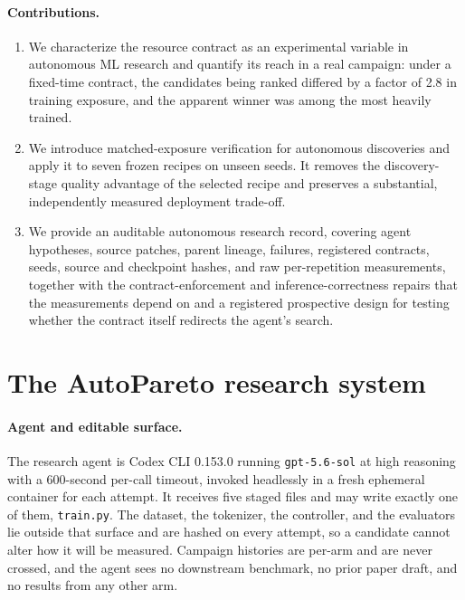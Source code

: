 \documentclass{article}
\begin{document}
\paragraph{Contributions.}
\begin{enumerate}\setlength{\itemsep}{1pt}
\item We characterize the resource contract as an experimental variable in autonomous ML research and quantify its reach in a real campaign: under a fixed-time contract, the candidates being ranked differed by a factor of 2.8 in training exposure, and the apparent winner was among the most heavily trained.
\item We introduce matched-exposure verification for autonomous discoveries and apply it to seven frozen recipes on unseen seeds. It removes the discovery-stage quality advantage of the selected recipe and preserves a substantial, independently measured deployment trade-off.
\item We provide an auditable autonomous research record, covering agent hypotheses, source patches, parent lineage, failures, registered contracts, seeds, source and checkpoint hashes, and raw per-repetition measurements, together with the contract-enforcement and inference-correctness repairs that the measurements depend on and a registered prospective design for testing whether the contract itself redirects the agent's search.
\end{enumerate}

\section{The AutoPareto research system}\label{sec:system}
\paragraph{Agent and editable surface.} The research agent is Codex CLI 0.153.0 running \texttt{gpt-5.6-sol} at high reasoning with a 600-second per-call timeout, invoked headlessly in a fresh ephemeral container for each attempt. It receives five staged files and may write exactly one of them, \texttt{train.py}. The dataset, the tokenizer, the controller, and the evaluators lie outside that surface and are hashed on every attempt, so a candidate cannot alter how it will be measured. Campaign histories are per-arm and are never crossed, and the agent sees no downstream benchmark, no prior paper draft, and no results from any other arm.
\end{document}
